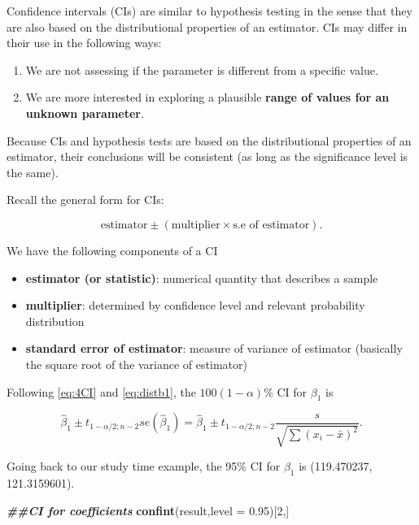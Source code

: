 \documentclass[
]{book}
\newenvironment{Shaded}{\begin{snugshade}}{\end{snugshade}}
\newcommand{\AttributeTok}[1]{\textcolor[rgb]{0.13,0.29,0.53}{#1}}
\newcommand{\DecValTok}[1]{\textcolor[rgb]{0.00,0.00,0.81}{#1}}
\newcommand{\DocumentationTok}[1]{\textcolor[rgb]{0.56,0.35,0.01}{\textbf{\textit{#1}}}}
\newcommand{\FloatTok}[1]{\textcolor[rgb]{0.00,0.00,0.81}{#1}}
\newcommand{\FunctionTok}[1]{\textcolor[rgb]{0.13,0.29,0.53}{\textbf{#1}}}
\newcommand{\NormalTok}[1]{#1}
\providecommand{\tightlist}{%
  \setlength{\itemsep}{0pt}\setlength{\parskip}{0pt}}
\begin{document}
Confidence intervals (CIs) are similar to hypothesis testing in the sense that they are also based on the distributional properties of an estimator. CIs may differ in their use in the following ways:

\begin{enumerate}
\def\labelenumi{\arabic{enumi}.}
\tightlist
\item
  We are not assessing if the parameter is different from a specific value.
\item
  We are more interested in exploring a plausible \textbf{range of values for an unknown parameter}.
\end{enumerate}

Because CIs and hypothesis tests are based on the distributional properties of an estimator, their conclusions will be consistent (as long as the significance level is the same).

Recall the general form for CIs:

\begin{equation} 
\mbox{estimator} \pm (\mbox{multiplier} \times \mbox{s.e of estimator}). 
\label{eq:4CI}
\end{equation}

We have the following components of a CI

\begin{itemize}
\tightlist
\item
  \textbf{estimator (or statistic)}: numerical quantity that describes a sample
\item
  \textbf{multiplier}: determined by confidence level and relevant probability distribution
\item
  \textbf{standard error of estimator}: measure of variance of estimator (basically the square root of the variance of estimator)
\end{itemize}

Following \eqref{eq:4CI} and \eqref{eq:distb1}, the \(100(1-\alpha)\%\) CI for \(\beta_1\) is

\begin{equation} 
\hat{\beta}_1 \pm t_{1-\alpha/2;n-2}  se(\hat{\beta}_1) = \hat{\beta}_1 \pm t_{1-\alpha/2;n-2} \frac{s}{\sqrt{\sum(x_i - \bar{x})^{2}}}.
\label{eq:4CIb1}
\end{equation}

Going back to our study time example, the 95\% CI for \(\beta_1\) is (119.470237, 121.3159601).

\begin{Shaded}
\begin{Highlighting}[]
\DocumentationTok{\#\#CI for coefficients}
\FunctionTok{confint}\NormalTok{(result,}\AttributeTok{level =} \FloatTok{0.95}\NormalTok{)[}\DecValTok{2}\NormalTok{,]}
\end{Highlighting}
\end{Shaded}
\end{document}
